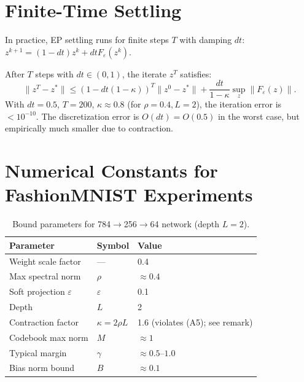 \documentclass[11pt]{article}
\begin{document}
\section{Finite-Time Settling}

In practice, EP settling runs for finite steps $T$ with damping $dt$:
$z^{k+1} = (1-dt)z^k + dt F_\varepsilon(z^k)$.

\begin{lemma}
After $T$ steps with $dt \in (0,1)$, the iterate $z^T$ satisfies:
\begin{equation}
  \|z^T - z^*\| \le (1 - dt(1-\kappa))^T \|z^0 - z^*\| + \frac{dt}{1-\kappa} \sup_z \|F_\varepsilon(z)\|.
\end{equation}
With $dt=0.5$, $T=200$, $\kappa \approx 0.8$ (for $\rho=0.4, L=2$), the
iteration error is $<10^{-10}$. The discretization error is $O(dt) =
O(0.5)$ in the worst case, but empirically much smaller due to
contraction.
\end{lemma}

\section{Numerical Constants for FashionMNIST Experiments}

\begin{table}[h]
\centering
\caption{Bound parameters for 784$\to$256$\to$64 network (depth $L=2$).}
\label{tab:constants}
\begin{tabular}{@{}lll@{}}
\toprule
Parameter & Symbol & Value \\
\midrule
Weight scale factor & --- & 0.4 \\
Max spectral norm & $\rho$ & $\approx 0.4$ \\
Soft projection $\varepsilon$ & $\varepsilon$ & 0.1 \\
Depth & $L$ & 2 \\
Contraction factor & $\kappa = 2\rho L$ & 1.6 (violates (A5); see remark) \\
Codebook max norm & $M$ & $\approx 1$ \\
Typical margin & $\gamma$ & $\approx 0.5$--$1.0$ \\
Bias norm bound & $B$ & $\approx 0.1$ \\
\bottomrule
\end{tabular}
\end{table}
\end{document}

